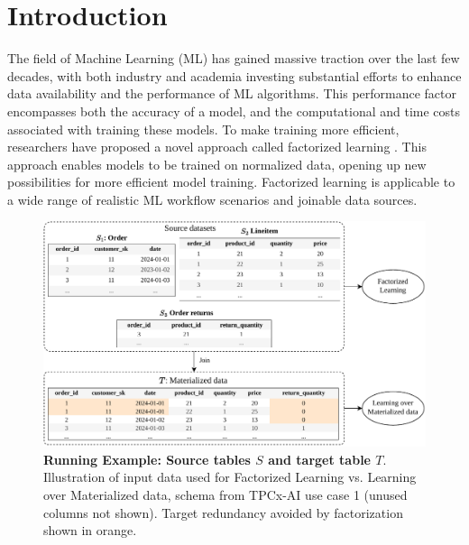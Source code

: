 
\chapter{Introduction}
\label{chapter:introduction}

The field of Machine Learning (ML) has gained massive traction over the last few decades, with both industry and academia investing substantial efforts to enhance data availability and the performance of ML algorithms. This performance factor encompasses both the accuracy of a model, and the computational and time costs associated with training these models.  To make training more efficient, researchers have proposed a novel approach called factorized learning \cite{orion_learning_gen_lin_models}. This approach enables models to be trained on normalized data, opening up new possibilities for more efficient model training. Factorized learning is applicable to a wide range of realistic ML workflow scenarios and joinable data sources.

\begin{figure}[h]
    \centering
    \includegraphics[width=0.95\linewidth]{chapters/01_introduction/figures/running-example-intro.pdf}
    \caption[Running Example: Source tables $S$ and target table $T$]{\textbf{Running Example: Source tables $S$ and target table $T$}. \\ Illustration of input data used for Factorized Learning vs. Learning over Materialized data, schema from TPCx-AI \cite{tpcx-ai} use case 1 (unused columns not shown). Target redundancy avoided by factorization shown in orange.}
    \label{fig:running-example-fac-vs-mat}
\end{figure}

